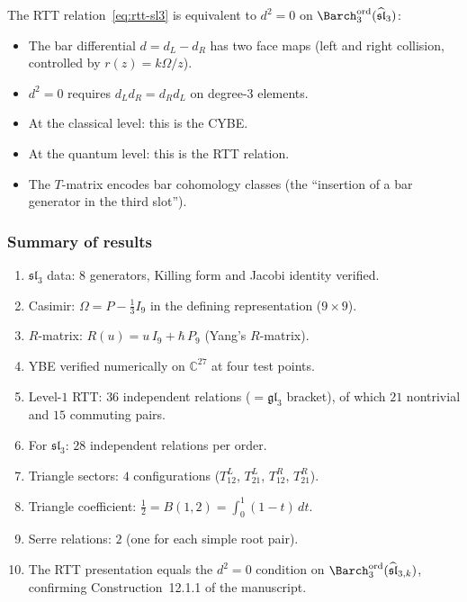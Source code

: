 The RTT relation~\eqref{eq:rtt-sl3} is equivalent to $d^2 = 0$
on $\Barch_3^{\mathrm{ord}}(\widehat{\mathfrak{sl}}_3)$:
\begin{itemize}
\item The bar differential
 $d = d_L - d_R$ has two face maps
 (left and right collision, controlled by $r(z) = k\Omega/z$).
\item $d^2 = 0$ requires $d_L d_R = d_R d_L$ on degree-$3$ elements.
\item At the classical level: this is the CYBE.
\item At the quantum level: this is the RTT relation.
\item The $T$-matrix encodes bar cohomology classes
 (the ``insertion of a bar generator in the third slot'').
\end{itemize}

\subsubsection*{Summary of results}

\begin{enumerate}
\item $\mathfrak{sl}_3$ data: $8$ generators,
 Killing form and Jacobi identity verified.
\item Casimir: $\Omega = P - \frac{1}{3} I_9$
 in the defining representation ($9 \times 9$).
\item $R$-matrix: $R(u) = u\,I_9 + \hbar\,P_9$ (Yang's $R$-matrix).
\item YBE verified numerically on $\mathbb{C}^{27}$ at four test points.
\item Level-$1$ RTT: $36$ independent relations ($= \mathfrak{gl}_3$ bracket),
 of which $21$ nontrivial and $15$ commuting pairs.
\item For $\mathfrak{sl}_3$: $28$ independent relations per order.
\item Triangle sectors: $4$ configurations
 ($T^L_{12}$, $T^L_{21}$, $T^R_{12}$, $T^R_{21}$).
\item Triangle coefficient: $\frac{1}{2} = B(1,2)
 = \int_0^1(1-t)\,dt$.
\item Serre relations: $2$ (one for each simple root pair).
\item The RTT presentation equals the $d^2 = 0$ condition on
 $\Barch_3^{\mathrm{ord}}(\widehat{\mathfrak{sl}}_{3,k})$,
 confirming Construction~12.1.1 of the manuscript.
\end{enumerate}
